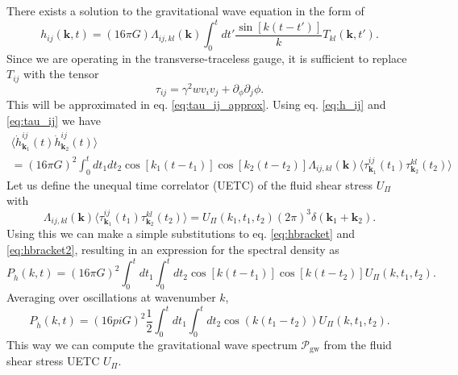 There exists a solution to the gravitational wave equation in the form of
\cite[eq. 3.2]{hindmarsh_gw_pt_2019}
\begin{equation}
h_{ij} (\bm{k},t) = (16 \pi G) \Lambda_{ij,kl}(\bm{k}) \int_0^t dt' \frac{\sin [k(t-t')]}{k} T_{kl}(\bm{k},t').
\label{eq:h_ij}
\end{equation}
Since we are operating in the transverse-traceless gauge, it is sufficient to replace $T_{ij}$ with the tensor
\cite[eq. 3.7]{hindmarsh_gw_pt_2019}
\begin{equation}
\tau_{ij} = \gamma^2 w v_i v_j + \partial_ \phi \partial_j \phi.
\label{eq:tau_ij}
\end{equation}
This will be approximated in eq. \eqref{eq:tau_ij_approx}.
Using eq. \eqref{eq:h_ij} and \eqref{eq:tau_ij} we have
\cite[eq. 3.8]{hindmarsh_gw_pt_2019}
\begin{multline}
\langle \dot{h}_{\bm{k}_1}^{ij}(t) \dot{h}_{\bm{k}_2}^{ij}(t) \rangle \\
= (16 \pi G)^2 \int_0^t dt_1 dt_2 \cos [k_1(t-t_1)] \cos [k_2(t-t_2)] \Lambda_{ij,kl}(\bm{k})
\langle \tau_{\bm{k}_1}^{ij}(t_1) \tau_{\bm{k}_2}^{kl}(t_2) \rangle
\end{multline}
Let us define the unequal time correlator (UETC) of the fluid shear stress $U_\Pi$ with
\cite[eq. 3.9]{hindmarsh_gw_pt_2019}
\begin{equation}
\Lambda_{ij,kl}(\bm{k}) \langle \tau_{\bm{k}_1}^{ij}(t_1) \tau_{\bm{k}_2}^{kl}(t_2) \rangle
= U_\Pi (k_1, t_1, t_2) (2 \pi)^3 \delta(\bm{k}_1 + \bm{k}_2).
\label{eq:hbracket2}
\end{equation}
Using this we can make a simple substitutions to eq. \eqref{eq:hbracket} and \eqref{eq:hbracket2},
resulting in an expression for the spectral density as
\cite[eq. 3.10]{hindmarsh_gw_pt_2019}
\begin{equation}
P_{\dot{h}} (k,t) = (16 \pi G)^2 \int_0^t dt_1 \int_0^t dt_2 \cos [k(t-t_1)] \cos [k(t-t_2)] U_\Pi (k, t_1, t_2).
\label{eq:p_dot_h}
\end{equation}
Averaging over oscillations at wavenumber $k$,
\begin{equation}
P_{\dot{h}} (k,t) = (16 pi G)^2 \frac{1}{2} \int_0^t dt_1 \int_0^t dt_2 \cos \left( k(t_1 - t_2) \right) U_\Pi (k, t_1, t_2).
\label{eq:p_dot_h_avg}
\end{equation}
This way we can compute the gravitational wave spectrum $\mathcal{P}_\text{gw}$ from the fluid shear stress UETC $U_\Pi$.


